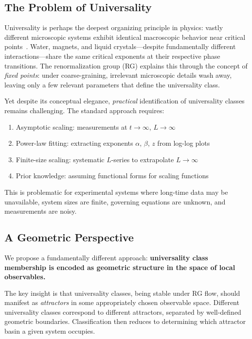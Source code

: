\documentclass[aps,pre,twocolumn,superscriptaddress,showpacs,longbibliography]{revtex4-2}
\begin{document}
\subsection{The Problem of Universality}

Universality is perhaps the deepest organizing principle in physics: vastly different microscopic systems exhibit identical macroscopic behavior near critical points~\cite{Kadanoff2000,Goldenfeld1992}. Water, magnets, and liquid crystals---despite fundamentally different interactions---share the same critical exponents at their respective phase transitions. The renormalization group (RG) explains this through the concept of \emph{fixed points}: under coarse-graining, irrelevant microscopic details wash away, leaving only a few relevant parameters that define the universality class.

Yet despite its conceptual elegance, \emph{practical} identification of universality classes remains challenging. The standard approach requires:
\begin{enumerate}
\item Asymptotic scaling: measurements at $t \to \infty$, $L \to \infty$
\item Power-law fitting: extracting exponents $\alpha$, $\beta$, $z$ from log-log plots
\item Finite-size scaling: systematic $L$-series to extrapolate $L \to \infty$
\item Prior knowledge: assuming functional forms for scaling functions
\end{enumerate}

This is problematic for experimental systems where long-time data may be unavailable, system sizes are finite, governing equations are unknown, and measurements are noisy.

\subsection{A Geometric Perspective}

We propose a fundamentally different approach: \textbf{universality class membership is encoded as geometric structure in the space of local observables.}

The key insight is that universality classes, being stable under RG flow, should manifest as \emph{attractors} in some appropriately chosen observable space. Different universality classes correspond to different attractors, separated by well-defined geometric boundaries. Classification then reduces to determining which attractor basin a given system occupies.
\end{document}
